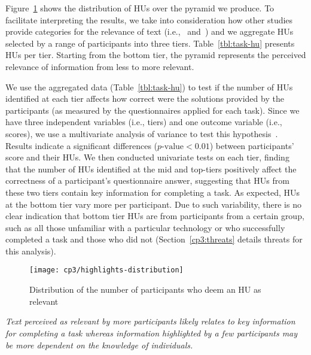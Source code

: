 Figure~\ref{fig:highlights-distribution} shows the distribution of HUs over the pyramid we produce.
To facilitate interpreting the results,
we take into consideration how other studies provide categories for the relevance of
text (i.e.,~\cite{Petrosyan2015} and~\cite{Jiang2017}) and 
we aggregate HUs selected by a range of participants into three tiers.
Table~\ref{tbl:task-hu} presents HUs per tier.
Starting from the bottom tier, the pyramid represents the perceived relevance of information from less to more relevant.


We use the aggregated data (Table~\ref{tbl:task-hu}) to test if the number of HUs identified at each tier affects how correct were the solutions provided by the participants (as measured by the questionnaires applied for each task). 
Since we have three independent variables (i.e., tiers) and one outcome variable (i.e., scores),
we use a multivariate analysis of variance to test this hypothesis~\cite{wohlin2012}. 
Results indicate a significant differences ($p\text{-value} < 0.01$) between participants' score and their HUs.
We then conducted univariate tests on each tier,
finding that 
the number of HUs identified at the mid and top-tiers 
positively affect the correctness of a participant's questionnaire answer, 
suggesting that HUs from these two tiers contain key
information for completing a task.
As expected, HUs at the bottom tier vary more per participant.
Due to such variability, there is no clear indication
that bottom tier HUs are from participants from a certain group, such as all those
unfamiliar with a particular technology or  who successfully
completed a task and those who did not (Section~\ref{cp3:threats} details threats for this analysis).







\begin{figure}
    \centering
    \texttt{[image: cp3/highlights-distribution]}
    \caption{Distribution of the number of participants who deem an HU as relevant}
    \label{fig:highlights-distribution}
\end{figure}








\medskip
\begin{bluequote}
    \textit{Text perceived as relevant by more participants likely relates
    to key information for completing a task whereas information
    highlighted by a few participants may be more dependent on the knowledge of individuals.}
\end{bluequote}
